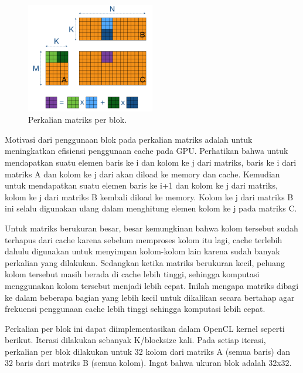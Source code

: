 \begin{figure}
	\centering
	\includegraphics[width=0.50\textwidth]
	{pics/matmul-block1.png}
	\caption{Perkalian matriks per blok.}
	\label{fig:matmulblock}
\end{figure}

Motivasi dari penggunaan blok pada perkalian matriks adalah untuk meningkatkan efisiensi penggunaan cache pada GPU. Perhatikan bahwa untuk mendapatkan suatu elemen baris ke i dan kolom ke j dari matriks, baris ke i dari matriks A dan kolom ke j dari akan diload ke memory dan cache. Kemudian untuk mendapatkan suatu elemen baris ke i+1 dan kolom ke j dari matriks, kolom ke j dari matriks B kembali diload ke memory. Kolom ke j dari matriks B ini selalu digunakan ulang dalam menghitung elemen kolom ke j pada matriks C.

Untuk matriks berukuran besar, besar kemungkinan bahwa kolom tersebut sudah terhapus dari cache karena sebelum memproses kolom itu lagi, cache terlebih dahulu digunakan untuk menyimpan kolom-kolom lain karena sudah banyak perkalian yang dilakukan. Sedangkan ketika matriks berukuran kecil, peluang kolom tersebut masih berada di cache lebih tinggi, sehingga komputasi menggunakan kolom tersebut menjadi lebih cepat. Inilah mengapa matriks dibagi ke dalam beberapa bagian yang lebih kecil untuk dikalikan secara bertahap agar frekuensi penggunaan cache lebih tinggi sehingga komputasi lebih cepat. 

Perkalian per blok ini dapat diimplementasikan dalam OpenCL kernel seperti berikut. Iterasi dilakukan sebanyak K/blocksize kali. Pada setiap iterasi, perkalian per blok dilakukan untuk 32 kolom dari matriks A (semua baris) dan 32 baris dari matriks B (semua kolom). Ingat bahwa ukuran blok adalah 32x32.

